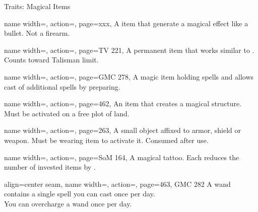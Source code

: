 \begin{PageBack}
\begin{Tables}{\backTableHeight}
\begin{Table}{Traits: Magical Items}
\begin{entry}{}{%
                name width=\conditionLength,%
                action=\Spellgun,
                page=xxx,
            }
                A item that generate a magical effect like a bullet. Not a firearm.
            \end{entry}
            \begin{entry}{}{%
                name width=\conditionLength,%
                action=\Spellheart,
                page=TV 221,
            }
                A permanent item that works similar to .
                Counts toward Talisman limit. \hfill
            \end{entry}
            \begin{entry}{}{%
                name width=\conditionLength,%
                action=\Staff,
                page=GMC 278,
            }
                A magic item holding spells and allows cast of additional spells by preparing.
            \end{entry}
            \begin{entry}{}{%
                name width=\conditionLength,%
                action=\Structure,
                page=462,
            }
                An item that creates a magical structure. Must be activated on a free plot of land.
            \end{entry}
            \begin{entry}{}{%
                name width=\conditionLength,%
                action=\Talisman,
                page=263,
            }
                A small object affixed to armor, shield or weapon.
                Must be wearing item to activate it.
                Consumed after use.
            \end{entry}
            \begin{entry}{}{%
                name width=\conditionLength,%
                action=\Tattoo,
                page=SoM 164,
            }
                A magical tattoo.
                Each reduces the number of invested items by .
            \end{entry}
            \begin{entry}{}{%
                align=center seam,
                name width=\conditionLength,%
                action=\Wand,
                page={463, GMC 282}
            }
                A wand contains a single spell you can cast once per day. \\
                You can overcharge a wand once per day.
                \Flat[][val=5]  \hfill
            \end{entry}
        \end{Table}
    \end{Tables}%
\end{PageBack}